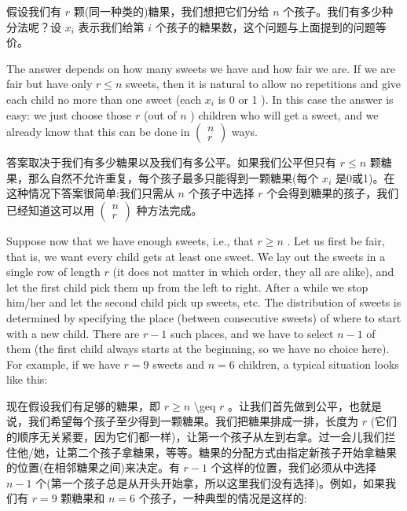 \documentclass[10pt]{article}
\begin{document}
\begin{tcolorbox}\relax
假设我们有 \(r\) 颗(同一种类的)糖果，我们想把它们分给 \(n\) 个孩子。我们有多少种分法呢？设 \({x}_{i}\) 表示我们给第 \(i\) 个孩子的糖果数，这个问题与上面提到的问题等价。
\end{tcolorbox}

The answer depends on how many sweets we have and how fair we are. If we are fair but have only \(r \leq  n\) sweets, then it is natural to allow no repetitions and give each child no more than one sweet (each \({x}_{i}\) is 0 or 1 ). In this case the answer is easy: we just choose those \(r\) (out of \(n\) ) children who will get a sweet, and we already know that this can be done in \(\left( \begin{array}{l} n \\  r \end{array}\right)\) ways.

\begin{tcolorbox}\relax
答案取决于我们有多少糖果以及我们有多公平。如果我们公平但只有 \(r \leq  n\) 颗糖果，那么自然不允许重复，每个孩子最多只能得到一颗糖果(每个 \({x}_{i}\) 是0或1)。在这种情况下答案很简单:我们只需从 \(n\) 个孩子中选择 \(r\) 个会得到糖果的孩子，我们已经知道这可以用 \(\left( \begin{array}{l} n \\  r \end{array}\right)\) 种方法完成。
\end{tcolorbox}

Suppose now that we have enough sweets, i.e., that \(r \geq  n\) . Let us first be fair, that is, we want every child gets at least one sweet. We lay out the sweets in a single row of length \(r\) (it does not matter in which order, they all are alike), and let the first child pick them up from the left to right. After a while we stop him/her and let the second child pick up sweets, etc. The distribution of sweets is determined by specifying the place (between consecutive sweets) of where to start with a new child. There are \(r - 1\) such places, and we have to select \(n - 1\) of them (the first child always starts at the beginning, so we have no choice here). For example, if we have \(r = 9\) sweets and \(n = 6\) children, a typical situation looks like this:

\begin{tcolorbox}\relax
现在假设我们有足够的糖果，即 \(r \geq  n\) \textbackslash geq \(r\) 。让我们首先做到公平，也就是说，我们希望每个孩子至少得到一颗糖果。我们把糖果排成一排，长度为 \(r\) (它们的顺序无关紧要，因为它们都一样)，让第一个孩子从左到右拿。过一会儿我们拦住他/她，让第二个孩子拿糖果，等等。糖果的分配方式由指定新孩子开始拿糖果的位置(在相邻糖果之间)来决定。有 \(r - 1\) 个这样的位置，我们必须从中选择 \(n - 1\) 个(第一个孩子总是从开头开始拿，所以这里我们没有选择)。例如，如果我们有 \(r = 9\) 颗糖果和 \(n = 6\) 个孩子，一种典型的情况是这样的:
\end{tcolorbox}
\end{document}
